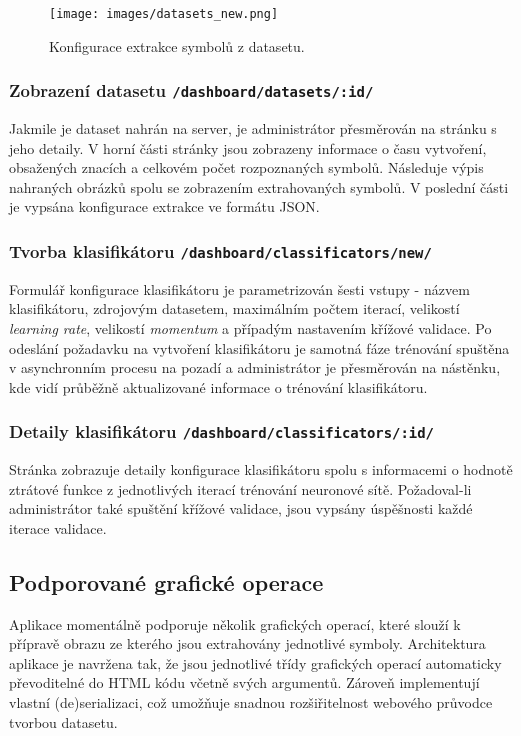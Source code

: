 \documentclass[
  field=ainfp,
  master=true,
  biblatex,
  sourcecodes=false,
  theorems=false,
  glossaries,
  index
]{kidiplom}
\begin{document}
\begin{figure}[h]
  \centering
  \texttt{[image: images/datasets\_new.png]}
  \caption{Konfigurace extrakce symbolů z datasetu.}
  \label{fig:dataset_new}
\end{figure}

\subsubsection*{Zobrazení datasetu \texttt{/dashboard/datasets/:id/}}
Jakmile je dataset nahrán na server, je administrátor přesměrován na stránku s jeho detaily. V horní části stránky jsou zobrazeny informace o času vytvoření, obsažených znacích a celkovém počet rozpoznaných symbolů. Následuje výpis nahraných obrázků spolu se zobrazením extrahovaných symbolů. V poslední části je vypsána konfigurace extrakce ve formátu JSON. 

\subsubsection*{Tvorba klasifikátoru \texttt{/dashboard/classificators/new/}}
Formulář konfigurace klasifikátoru je parametrizován šesti vstupy - názvem klasifikátoru, zdrojovým datasetem, maximálním počtem iterací, velikostí \textit{learning rate}, velikostí \textit{momentum} a případým nastavením křížové validace. Po odeslání požadavku na vytvoření klasifikátoru je samotná fáze trénování spuštěna v asynchronním procesu na pozadí a administrátor je přesměrován na nástěnku, kde vidí průběžně aktualizované informace o trénování klasifikátoru.

\subsubsection*{Detaily klasifikátoru \texttt{/dashboard/classificators/:id/}}
Stránka zobrazuje detaily konfigurace klasifikátoru spolu s informacemi o hodnotě ztrátové funkce z jednotlivých iterací trénování neuronové sítě. Požadoval-li administrátor také spuštění křížové validace, jsou vypsány úspěšnosti každé iterace validace.


\subsection{Podporované grafické operace}
Aplikace momentálně podporuje několik grafických operací, které slouží k přípravě obrazu ze kterého jsou extrahovány jednotlivé symboly. Architektura aplikace je navržena tak, že jsou jednotlivé třídy grafických operací automaticky převoditelné do HTML kódu včetně svých argumentů. Zároveň implementují vlastní (de)se\-riali\-zaci, což umožňuje snadnou rozšiřitelnost webového průvodce tvorbou data\-setu.
\end{document}

